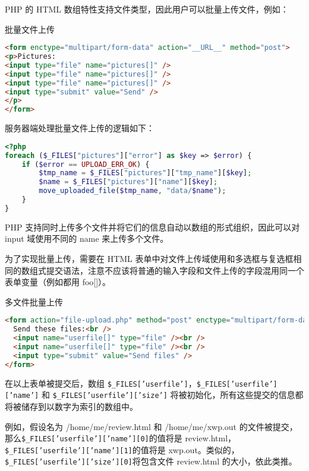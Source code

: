 PHP 的 HTML 数组特性支持文件类型，因此用户可以批量上传文件，例如：

\begin{example}
批量文件上传
\begin{lstlisting}[language=HTML]
<form enctype="multipart/form-data" action="__URL__" method="post">
<p>Pictures:
<input type="file" name="pictures[]" />
<input type="file" name="pictures[]" />
<input type="file" name="pictures[]" />
<input type="submit" value="Send" />
</p>
</form>
\end{lstlisting}
\end{example}

服务器端处理批量文件上传的逻辑如下：

\begin{lstlisting}[language=PHP]
<?php
foreach ($_FILES["pictures"]["error"] as $key => $error) {
    if ($error == UPLOAD_ERR_OK) {
        $tmp_name = $_FILES["pictures"]["tmp_name"][$key];
        $name = $_FILES["pictures"]["name"][$key];
        move_uploaded_file($tmp_name, "data/$name");
    }
}
\end{lstlisting}

PHP 支持同时上传多个文件并将它们的信息自动以数组的形式组织，因此可以对 input 域使用不同的 name 来上传多个文件。

为了实现批量上传，需要在 HTML 表单中对文件上传域使用和多选框与复选框相同的数组式提交语法，注意不应该将普通的输入字段和文件上传的字段混用同一个表单变量（例如都用 foo[]）。

\begin{example}
多文件批量上传
\begin{lstlisting}[language=HTML]
<form action="file-upload.php" method="post" enctype="multipart/form-data">
  Send these files:<br />
  <input name="userfile[]" type="file" /><br />
  <input name="userfile[]" type="file" /><br />
  <input type="submit" value="Send files" />
</form>
\end{lstlisting}
\end{example}

在以上表单被提交后，数组 \texttt{\$\_FILES['userfile']}，\texttt{\$\_FILES['userfile']['name']} 和 \texttt{\$\_FILES['userfile']['size']} 将被初始化，所有这些提交的信息都将被储存到以数字为索引的数组中。

例如，假设名为 /home/me/review.html 和 /home/me/xwp.out 的文件被提交，那么\texttt{\$\_FILES['userfile']['name'][0]}的值将是 review.html，\texttt{\$\_FILES['userfile']['name'][1]}的值将是 xwp.out。类似的，\texttt{\$\_FILES['userfile']['size'][0]}将包含文件 review.html 的大小，依此类推。

